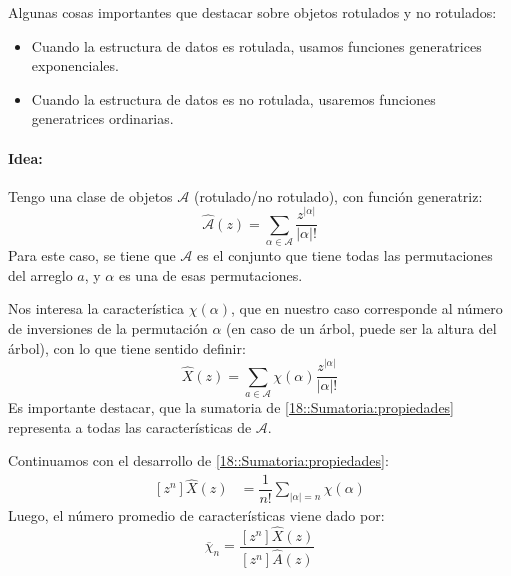 \documentclass[english, spanish, fleqn, 10pt]{article}
\numberwithin{equation}{section}
\newcommand{\nparentesis}[1]{\left( #1 \right)}
\newcommand{\nabsoluto}[1]{\left| #1 \right|}
\newcommand{\ncorchetes}[1]{\left[ #1 \right]}
\theoremstyle{definition}
\begin{document}
Algunas cosas importantes que destacar sobre objetos rotulados y no rotulados:
\begin{itemize}
	\item Cuando la estructura de datos es rotulada, usamos funciones generatrices exponenciales.
	
	\item Cuando la estructura de datos es no rotulada, usaremos funciones generatrices ordinarias.
\end{itemize}

\paragraph{Idea:} Tengo una clase de objetos $\mathcal{A}$ (rotulado/no rotulado), con función generatriz:
\begin{equation*}
\hat{\mathcal{A}}\nparentesis{z}=\sum_{\alpha \in \mathcal{A}} \dfrac{z^{\nabsoluto{\alpha}}}{\nabsoluto{\alpha}!}
\end{equation*}
Para este caso, se tiene que $\mathcal{A}$ es el conjunto que tiene todas las permutaciones del arreglo $a$, y $\alpha$ es una de esas permutaciones.



Nos interesa la característica $\chi\nparentesis{\alpha}$, que en nuestro caso corresponde al número de inversiones de la permutación $\alpha$ (en caso de un árbol, puede ser la altura del árbol), con lo que tiene sentido definir: 
\begin{equation}\label{18::Sumatoria:propiedades}
\hat X \nparentesis{z} = \sum_{a \in \mathcal{A}} \chi \nparentesis{\alpha} \dfrac{z^{\nabsoluto{\alpha}}}{\nabsoluto{\alpha}!}
\end{equation}
Es importante destacar, que la sumatoria de \eqref{18::Sumatoria:propiedades} representa a todas las características de $\mathcal{A}$.

Continuamos con el desarrollo de \eqref{18::Sumatoria:propiedades}:
\begin{align*}
\ncorchetes{z^n} \hat X \nparentesis{z} &= \dfrac{1}{n!} \sum_{\nabsoluto{\alpha} = n}\chi \nparentesis{\alpha}
\end{align*}
Luego, el número promedio de características viene dado por:
\begin{equation}
\overline{\chi}_n = \dfrac{\ncorchetes{z^n} \hat X \nparentesis{z}}{\ncorchetes{z^n} \hat A \nparentesis{z}}
\end{equation}
\end{document}
